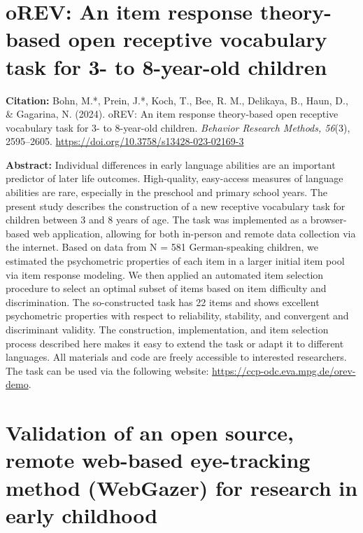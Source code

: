 \documentclass[
]{scrbook}
\begin{document}
\newpage

\section{oREV: An item response theory-based open receptive vocabulary task for 3- to 8-year-old children}\label{orev-an-item-response-theory-based-open-receptive-vocabulary-task-for-3--to-8-year-old-children}

\textbf{Citation:} Bohn, M.*, Prein, J.*, Koch, T., Bee, R. M., Delikaya, B., Haun, D., \& Gagarina, N. (2024). oREV: An item response theory-based open receptive vocabulary task for 3- to 8-year-old children. \emph{Behavior Research Methods, 56}(3), 2595--2605. \url{https://doi.org/10.3758/s13428-023-02169-3}

\textbf{Abstract:} Individual differences in early language abilities are an important predictor of later life outcomes. High-quality, easy-access measures of language abilities are rare, especially in the preschool and primary school years. The present study describes the construction of a new receptive vocabulary task for children between 3 and 8 years of age. The task was implemented as a browser-based web application, allowing for both in-person and remote data collection via the internet. Based on data from N = 581 German-speaking children, we estimated the psychometric properties of each item in a larger initial item pool via item response modeling. We then applied an automated item selection procedure to select an optimal subset of items based on item difficulty and discrimination. The so-constructed task has 22 items and shows excellent psychometric properties with respect to reliability, stability, and convergent and discriminant validity. The construction, implementation, and item selection process described here makes it easy to extend the task or adapt it to different languages. All materials and code are freely accessible to interested researchers. The task can be used via the following website: \url{https://ccp-odc.eva.mpg.de/orev-demo}.

\newpage

\section{Validation of an open source, remote web-based eye-tracking method (WebGazer) for research in early childhood}\label{validation-of-an-open-source-remote-web-based-eye-tracking-method-webgazer-for-research-in-early-childhood}
\end{document}
